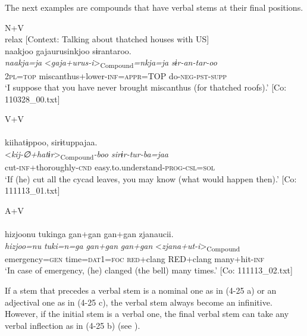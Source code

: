The next examples are compounds that have verbal stems at their final positions.

\ea \label{ex:4.25} \ea  N+V \label{ex:4.25a}\\relax
    [Context: Talking about thatched houses with US]\\
\glll   naakjoo  gajaurusinkjoo  sɨrantaroo.\\
      \textit{naakja=ja}  <\textit{gaja+urus-i}>\textsubscript{Compound}\textit{=nkja=ja}  \textit{sɨr-an-tar-oo}\\
      2\textsc{pl}=\textsc{top}  miscanthus+lower-\textsc{inf}=\textsc{appr}=TOP  do-\textsc{neg}-\textsc{pst}-\textsc{supp}\\
      \glt       ‘I suppose that you have never brought miscanthus (for thatched roofs).’ [Co: 110328\_00.txt]

\ex  V+V\\\\
\glll     kiihatɨppoo,  sirɨtuppajaa.\\
      <\textit{kij-∅+hatɨr}>\textsubscript{Compound}\textit{{}-boo  sirɨr-tur-ba=jaa}\\
      cut-\textsc{inf}+thoroughly-\textsc{cnd}  easy.to.understand-\textsc{prog}-\textsc{csl}=\textsc{sol}\\
    \glt       ‘If (he) cut all the cycad leaves, you may know (what would happen then).’ [Co: 111113\_01.txt]

\ex A+V\\\\
\glll    {\textbar}hizjoo{\textbar}nu  tukinga  gan+gan  gan+gan    zjanaucii.\\
      \textit{hizjoo=nu}  \textit{tuki=n=ga}  \textit{gan+gan}  \textit{gan+gan}   <\textit{zjana+ut-i}>\textsubscript{Compound}\\
      emergency=\textsc{gen}  time=\textsc{dat}1=\textsc{foc}  \textsc{red}+clang  RED+clang     many+hit-\textsc{inf}    \\
    \glt       ‘In case of emergency, (he) clanged (the bell) many times.’ [Co: 111113\_02.txt]
    \z
\z

If a stem that precedes a verbal stem is a nominal one as in (4-25 a) or an adjectival one as in (4-25 c), the verbal stem always become an infinitive. However, if the initial stem is a verbal one, the final verbal stem can take any verbal inflection as in (4-25 b) (see ).

